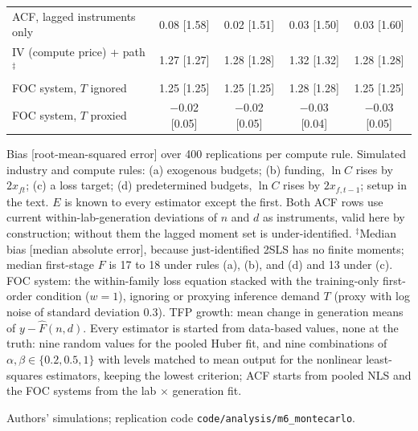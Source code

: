 \begin{table}[tp]
\begin{tabular}{@{}lcccc@{}}
ACF, lagged instruments only & 0.08 [1.58] & 0.02 [1.51] & 0.03 [1.50] & 0.03 [1.60] \\
IV (compute price) + path$^{\ddagger}$ & 1.27 [1.27] & 1.28 [1.28] & 1.32 [1.32] & 1.28 [1.28] \\
FOC system, $T$ ignored & 1.25 [1.25] & 1.25 [1.25] & 1.28 [1.28] & 1.25 [1.25] \\
FOC system, $T$ proxied & $-$0.02 [0.05] & $-$0.02 [0.05] & $-$0.03 [0.04] & $-$0.03 [0.05] \\
\bottomrule
\end{tabular}
\par\smallskip
\begin{tablenotes}Bias [root-mean-squared error] over 400 replications per compute rule. Simulated industry and compute rules: (a) exogenous budgets; (b) funding, $\ln C$ rises by $2x_{ft}$; (c) a loss target; (d) predetermined budgets, $\ln C$ rises by $2x_{f,t-1}$; setup in the text. $E$ is known to every estimator except the first. Both ACF rows use current within-lab-generation deviations of $n$ and $d$ as instruments, valid here by construction; without them the lagged moment set is under-identified. $^{\ddagger}$Median bias [median absolute error], because just-identified 2SLS has no finite moments; median first-stage $F$ is 17 to 18 under rules (a), (b), and (d) and 13 under (c). FOC system: the within-family loss equation stacked with the training-only first-order condition ($w=1$), ignoring or proxying inference demand $T$ (proxy with log noise of standard deviation 0.3). TFP growth: mean change in generation means of $y-\hat F(n,d)$. Every estimator is started from data-based values, none at the truth: nine random values for the pooled Huber fit, and nine combinations of $\alpha,\beta\in\{0.2,0.5,1\}$ with levels matched to mean output for the nonlinear least-squares estimators, keeping the lowest criterion; ACF starts from pooled NLS and the FOC systems from the lab $\times$ generation fit.\end{tablenotes}
\begin{tablenotes}[Source]Authors' simulations; replication code \texttt{code/analysis/m6\_montecarlo}.\end{tablenotes}
\end{table}
